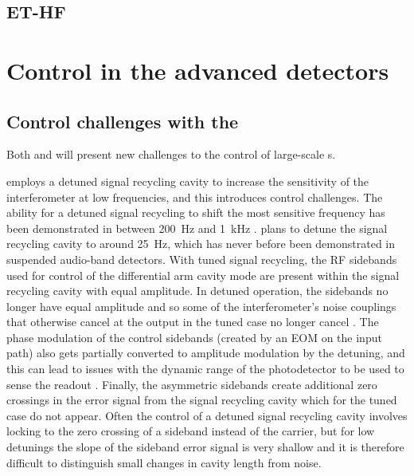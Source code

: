 \subsection{ET-HF}

\section{Control in the advanced detectors}



\subsection{Control challenges with the \ET{}}
Both \ETLF{} and \ETHF{} will present new challenges to the control of large-scale \DRFPMI{}s.

\ETLF{} employs a detuned signal recycling cavity to increase the sensitivity of the interferometer at low frequencies, and this introduces control challenges. The ability for a detuned signal recycling to shift the most sensitive frequency has been demonstrated in \GEO{} between \SI{200}{\hertz} and \SI{1}{\kilo\hertz} \cite{Hild2006}. \ETLF{} plans to detune the signal recycling cavity to around \SI{25}{\hertz}, which has never before been demonstrated in suspended audio-band detectors. With tuned signal recycling, the \gls{RF} sidebands used for control of the differential arm cavity mode are present within the signal recycling cavity with equal amplitude. In detuned operation, the sidebands no longer have equal amplitude and so some of the interferometer's noise couplings that otherwise cancel at the output in the tuned case no longer cancel \cite{Hild2007}. The phase modulation of the control sidebands (created by an \gls{EOM} on the input path) also gets partially converted to amplitude modulation by the detuning, and this can lead to issues with the dynamic range of the photodetector to be used to sense the readout \cite{Grote2007}. Finally, the asymmetric sidebands create additional zero crossings in the error signal from the signal recycling cavity which for the tuned case do not appear. Often the control of a detuned signal recycling cavity involves locking to the zero crossing of a sideband instead of the carrier, but for low detunings the slope of the sideband error signal is very shallow and it is therefore difficult to distinguish small changes in cavity length from noise.

